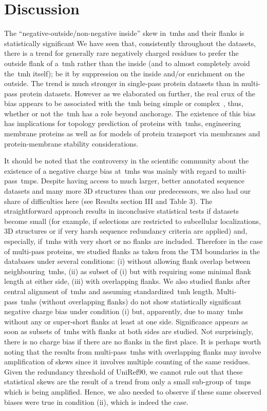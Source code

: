 \section{Discussion}

The ``negative-outside/non-negative inside'' skew in~\gls{tmh}s and their flanks is statistically significant
We have seen that, consistently throughout the datasets, there is a trend for generally rare negatively charged residues to prefer the outside flank of a~\gls{tmh} rather than the inside (and to almost completely avoid the~\gls{tmh} itself); be it by suppression on the inside and/or enrichment on the outside.
The trend is much stronger in single-pass protein datasets than in multi-pass protein datasets.
However as we elaborated on further, the real crux of the bias appears to be associated with the~\gls{tmh} being simple or complex~\cite{Wong2011, Wong2012}, thus, whether or not the~\gls{tmh} has a role beyond anchorage.
The existence of this bias has implications for topology prediction of proteins with~\gls{tmh}s, engineering membrane proteins as well as for models of protein transport via membranes and protein-membrane stability considerations.

It should be noted that the controversy in the scientific community about the existence of a negative charge bias at~\gls{tmh}s was mainly with regard to multi-pass~\gls{tmp}s.
Despite having access to much larger, better annotated sequence datasets and many more 3D structures than our predecessors, we also had our share of difficulties here (see Results section III and Table 3).
The straightforward approach results in inconclusive statistical tests if datasets become small (for example, if selections are restricted to subcellular localizations, 3D structures or if very harsh sequence redundancy criteria are applied) and, especially, if~\gls{tmh}s with very short or no flanks are included.
Therefore in the case of multi-pass proteins, we studied flanks as taken from the TM boundaries in the databases under several conditions: (i) without allowing flank overlap between neighbouring~\gls{tmh}s, (ii) as subset of (i) but with requiring some minimal flank length at either side, (iii) with overlapping flanks.
We also studied flanks after central alignment of~\gls{tmh}s and assuming standardized~\gls{tmh} length.
Multi-pass~\gls{tmh}s (without overlapping flanks) do not show statistically significant negative charge bias under condition (i) but, apparently, due to many~\gls{tmh}s without any or super-short flanks at least at one side.
Significance appears as soon as subsets of~\gls{tmh}s with flanks at both sides are studied.
Not surprisingly, there is no charge bias if there are no flanks in the first place.
It is perhaps worth noting that the results from multi-pass~\gls{tmh}s with overlapping flanks may involve amplification of skews since it involves multiple counting of the same residues.
Given the redundancy threshold of UniRef90, we cannot rule out that these statistical skews are the result of a trend from only a small sub-group of~\gls{tmp}s which is being amplified.
Hence, we also needed to observe if these same observed biases were true in condition (ii), which is indeed the case.

